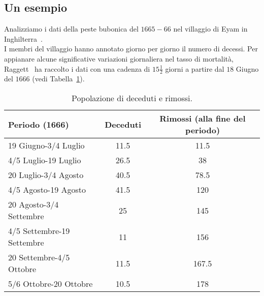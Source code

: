 \subsection{Un esempio}
Analizziamo i dati della peste bubonica del $1665-66$ nel villaggio di Eyam in Inghilterra~\cite{raggett1982stochastic}. \\
I membri del villaggio hanno annotato giorno per giorno il numero di decessi. Per appianare alcune significative variazioni giornaliera nel tasso di mortalit\`a,  Raggett~\cite{raggett1982stochastic} ha raccolto  i dati con una cadenza di $15 \frac{1}{2}$ giorni a partire dal $18$ Giugno del $1666$ (vedi Tabella~\ref{table::1}).
\begin{table}[!ht]
\centering
\caption{Popolazione di deceduti e rimossi.}
\label{table::1}
\begin{tabular}{l | c | c }

Periodo (1666) & Deceduti & Rimossi (alla fine del periodo) \\
\hline

19 Giugno-3/4 Luglio & 11.5 & 11.5\\
4/5 Luglio-19 Luglio & 26.5 & 38\\ 
20 Luglio-3/4 Agosto & 40.5 & 78.5\\
4/5 Agosto-19 Agosto & 41.5 & 120\\
20 Agosto-3/4 Settembre & 25 & 145\\
4/5 Settembre-19 Settembre & 11 & 156\\
20 Settembre-4/5 Ottobre & 11.5 & 167.5\\
5/6 Ottobre-20 Ottobre & 10.5 & 178\\

\end{tabular}

\end{table}

